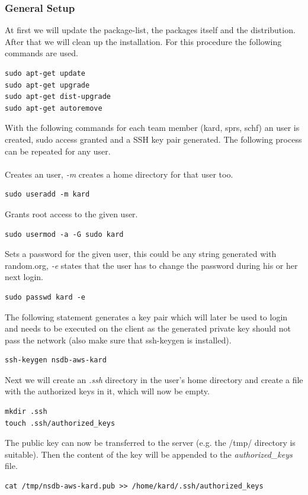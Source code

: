 \subsubsection{General Setup}
At first we will update the package-list, the packages itself and the distribution. After that we will clean up the installation. For this procedure the following commands are used.
\begin{lstlisting}
sudo apt-get update
sudo apt-get upgrade
sudo apt-get dist-upgrade
sudo apt-get autoremove
\end{lstlisting}

With the following commands for each team member (kard, sprs, schf) an user is created, sudo access granted and a SSH key pair generated. The following process can be repeated for any user. 
\\\\
Creates an user, \textit{-m} creates a home directory for that user too.
\begin{lstlisting}
sudo useradd -m kard
\end{lstlisting}

Grants root access to the given user.
\begin{lstlisting}
sudo usermod -a -G sudo kard
\end{lstlisting}

Sets a password for the given user, this could be any string generated with random.org, \textit{-e} states that the user has to change the password during his or her next login.
\begin{lstlisting}
sudo passwd kard -e
\end{lstlisting}

The following statement generates a key pair which will later be used to login and needs to be executed on the client as the generated private key should not pass the network (also make sure that ssh-keygen is installed).
\begin{lstlisting}
ssh-keygen nsdb-aws-kard
\end{lstlisting}

Next we will create an \textit{.ssh} directory in the user's home directory and create a file with the authorized keys in it, which will now be empty.
\begin{lstlisting}
mkdir .ssh
touch .ssh/authorized_keys
\end{lstlisting}

The public key can now be transferred to the server (e.g. the /tmp/ directory is suitable). Then the content of the key will be appended to the \textit{authorized\_keys} file.
\begin{lstlisting}
cat /tmp/nsdb-aws-kard.pub >> /home/kard/.ssh/authorized_keys
\end{lstlisting}

